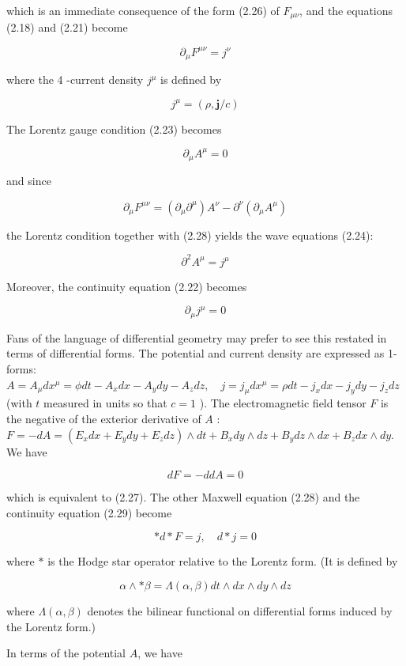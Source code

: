 \documentclass[10pt, letterpaper]{article}
\begin{document}
which is an immediate consequence of the form (2.26) of $F_{\mu \nu}$, and the equations (2.18) and (2.21) become

$$
\partial_{\mu} F^{\mu \nu}=j^{\nu}
$$

where the 4 -current density $j^{\mu}$ is defined by

$$
j^{\mu}=(\rho, \mathbf{j} / c)
$$

The Lorentz gauge condition (2.23) becomes

$$
\partial_{\mu} A^{\mu}=0
$$

and since

$$
\partial_{\mu} F^{\mu \nu}=\left(\partial_{\mu} \partial^{\mu}\right) A^{\nu}-\partial^{\nu}\left(\partial_{\mu} A^{\mu}\right)
$$

the Lorentz condition together with (2.28) yields the wave equations (2.24):

$$
\partial^{2} A^{\mu}=j^{\mu}
$$

Moreover, the continuity equation (2.22) becomes

$$
\partial_{\mu} j^{\mu}=0
$$

Fans of the language of differential geometry may prefer to see this restated in terms of differential forms. The potential and current density are expressed as 1-forms:\\
$A=A_{\mu} d x^{\mu}=\phi d t-A_{x} d x-A_{y} d y-A_{z} d z, \quad j=j_{\mu} d x^{\mu}=\rho d t-j_{x} d x-j_{y} d y-j_{z} d z$ (with $t$ measured in units so that $c=1$ ). The electromagnetic field tensor $F$ is the negative of the exterior derivative of $A$ :\\
$F=-d A=\left(E_{x} d x+E_{y} d y+E_{z} d z\right) \wedge d t+B_{x} d y \wedge d z+B_{y} d z \wedge d x+B_{z} d x \wedge d y$.\\
We have

$$
d F=-d d A=0
$$

which is equivalent to (2.27). The other Maxwell equation (2.28) and the continuity equation (2.29) become

$$
* d * F=j, \quad d * j=0
$$

where $*$ is the Hodge star operator relative to the Lorentz form. (It is defined by

$$
\alpha \wedge * \beta=\Lambda(\alpha, \beta) d t \wedge d x \wedge d y \wedge d z
$$

where $\Lambda(\alpha, \beta)$ denotes the bilinear functional on differential forms induced by the Lorentz form.)

In terms of the potential $A$, we have
\end{document}
